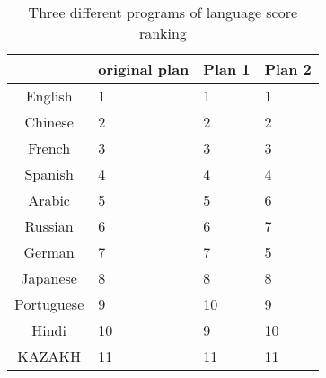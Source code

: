 \begin{appendices}
\begin{table}[htbp]
	\centering
	\caption{Three different programs of language score ranking}
	\begin{tabular}{cp{3.6cm}p{3.6cm}p{3.6cm}}
		\toprule
		& original plan & Plan 1 & Plan 2 \\
		\midrule
		English & 1     & 1     & 1 \\
		\midrule
		Chinese & 2     & 2     & 2 \\
		\midrule
		French & 3     & 3     & 3 \\
		\midrule
		Spanish & 4     & 4     & 4 \\
		\midrule
		Arabic & 5     & 5     & 6 \\
		\midrule
		Russian & 6     & 6     & 7 \\
		\midrule
		German & 7     & 7     & 5 \\
		\midrule
		Japanese & 8     & 8     & 8 \\
		\midrule
		Portuguese & 9     & 10    & 9 \\
		\midrule
		Hindi & 10    & 9     & 10 \\
		\midrule
		KAZAKH & 11    & 11    & 11 \\
		\bottomrule
	\end{tabular}%
	\label{tab:addlabel}%
\end{table}%


	
\end{appendices}